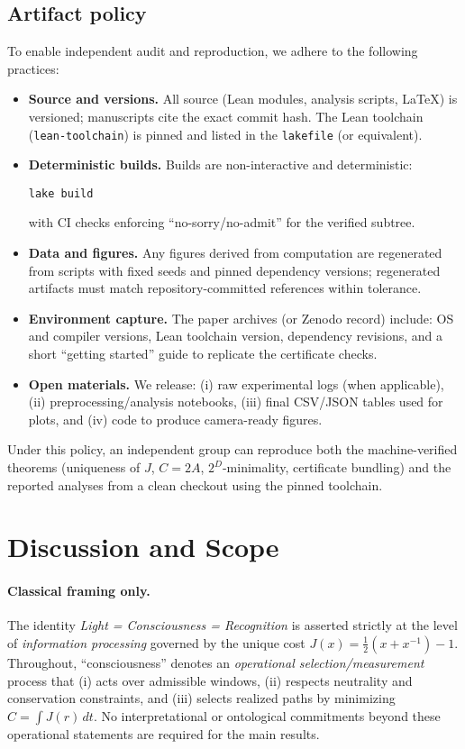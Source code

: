 \documentclass[12pt,a4paper]{article}
\begin{document}
\subsection{Artifact policy}
To enable independent audit and reproduction, we adhere to the following practices:
\begin{itemize}
  \item \textbf{Source and versions.} All source (Lean modules, analysis scripts, LaTeX) is versioned; manuscripts cite the exact commit hash. The Lean toolchain (\texttt{lean-toolchain}) is pinned and listed in the \texttt{lakefile} (or equivalent).
  \item \textbf{Deterministic builds.} Builds are non-interactive and deterministic:
\begin{verbatim}
lake build
\end{verbatim}
with CI checks enforcing “no-sorry/no-admit” for the verified subtree.
  \item \textbf{Data and figures.} Any figures derived from computation are regenerated from scripts with fixed seeds and pinned dependency versions; regenerated artifacts must match repository-committed references within tolerance.
  \item \textbf{Environment capture.} The paper archives (or Zenodo record) include: OS and compiler versions, Lean toolchain version, dependency revisions, and a short “getting started” guide to replicate the certificate checks.
  \item \textbf{Open materials.} We release: (i) raw experimental logs (when applicable), (ii) preprocessing/analysis notebooks, (iii) final CSV/JSON tables used for plots, and (iv) code to produce camera-ready figures.
\end{itemize}
Under this policy, an independent group can reproduce both the machine-verified theorems (uniqueness of $J$, $C{=}2A$, $2^{D}$-minimality, certificate bundling) and the reported analyses from a clean checkout using the pinned toolchain.

\section{Discussion and Scope}

\paragraph{Classical framing only.}
The identity \emph{Light = Consciousness = Recognition} is asserted strictly at the level of \emph{information processing} governed by the unique cost $J(x)=\tfrac{1}{2}(x+x^{-1})-1$. Throughout, “consciousness” denotes an \emph{operational selection/measurement} process that (i) acts over admissible windows, (ii) respects neutrality and conservation constraints, and (iii) selects realized paths by minimizing $C=\int J(r)\,dt$. No interpretational or ontological commitments beyond these operational statements are required for the main results.
\end{document}
